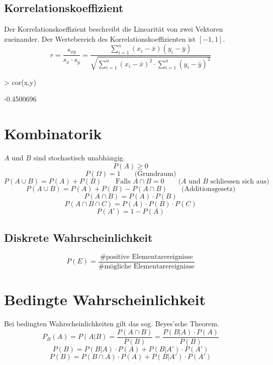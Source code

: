 \subsection{Korrelationskoeffizient}
Der Korrelationskoeffizient beschreibt die Linearität von zwei Vektoren 
zueinander. Der Wertebereich des Korrelationskoeffizienten ist $[-1, 1]$. 
\[ r = \frac{s_{xy}}{s_x \cdot s_y} 
= \frac{\sum\limits_{i=1}^{n} (x_i - \bar{x}) (y_i - \bar{y})}
{\sqrt{\sum\limits_{i=1}^{n} (x_i - \bar{x})^2  \cdot 
\sum\limits_{i=1}^{n} (y_i - \bar{y})^2 }} \]
\begin{Schunk}
\begin{Sinput}
> cor(x,y)
\end{Sinput}
\begin{Soutput}
[1] -0.4500696
\end{Soutput}
\end{Schunk}

\section{Kombinatorik}
$A$ und $B$ sind stochastisch unabhängig. 
\[ P(A) \geq 0 \]
\[ P(\Omega) = 1 \qquad \text{(Grundraum)} \]
\[ P(A \cup B) = P(A) + P(B) \qquad \text{Falls } A \cap B = 0 
\qquad \text{($A$ und $B$ schliessen sich aus)} \]
\[ P(A \cup B) = P(A) + P(B) - P(A \cap B) \qquad \text{(Additionsgesetz)} \]
\[ P(A \cap B) = P(A) \cdot P(B) \]
\[ P(A \cap B \cap C) = P(A) \cdot P(B) \cdot P(C) \]
\[ P(A') = 1 - P(A) \]

\subsection{Diskrete Wahrscheinlichkeit}
\[ P(E) = \frac{\text{\# positive Elementarereignisse}}
{\text{\# mögliche Elementarereignisse}} \]

\newpage
\section{Bedingte Wahrscheinlichkeit}
Bei bedingten Wahrscheinlichkeiten gilt das sog. Beyes'sche Theorem.
\[ \boxed{ P_B(A) = P(A|B) = \frac{P(A \cap B)}{P(B)} = \frac{P(B|A)\cdot P(A)}{P(B)} } \]
\[ \boxed{P(B) = P(B|A) \cdot P(A) + P(B|A') \cdot P(A')} \]
\[ \boxed{P(B) = P(B \cap A) \cdot P(A) + P(B|A') \cdot P(A')} \]

